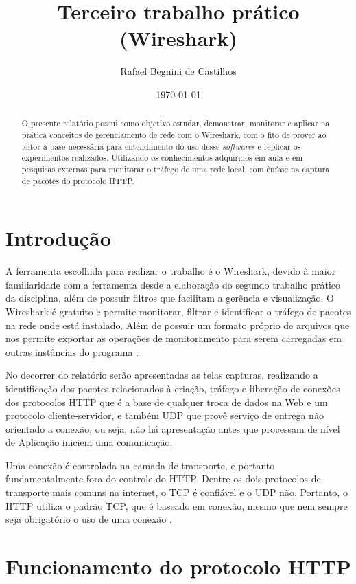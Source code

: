 \documentclass[12pt]{article}
\author{Rafael Begnini de Castilhos}
\title{Terceiro trabalho prático (Wireshark)}
\date{\today}
\begin{document}
\maketitle

\begin{abstract}
O presente relatório possui como objetivo estudar, demonstrar, monitorar e aplicar na prática conceitos de gerenciamento de rede com o Wireshark, com o fito de prover ao leitor a base necessária para entendimento  do uso desse \emph{softwares} e replicar os experimentos realizados. Utilizando os conhecimentos adquiridos em aula e em pesquisas externas para monitorar o tráfego de uma rede local, com ênfase na captura de pacotes do protocolo HTTP.
\end{abstract}

{\setlength\parskip {\fill}
    \tableofcontents
}


\section{Introdução}
A ferramenta escolhida para realizar o trabalho é o Wireshark, devido à maior familiaridade com a ferramenta desde a elaboração do segundo trabalho prático da disciplina, além de possuir filtros que facilitam a gerência e visualização. O Wireshark é gratuito e permite monitorar, filtrar e identificar o tráfego de pacotes na rede onde está instalado. Além de possuir um formato próprio de arquivos que nos permite exportar as operações de monitoramento para serem carregadas em outras instâncias do programa \cite{wireshark}.

No decorrer do relatório serão apresentadas as telas capturas, realizando a identificação dos pacotes relacionados à criação, tráfego e liberação de conexões dos  protocolos HTTP que é a base de qualquer troca de dados na Web e um protocolo cliente-servidor, e também UDP que provê serviço de entrega não orientado a conexão, ou seja, não há apresentação antes que processam de nível de Aplicação iniciem uma comunicação.

Uma conexão é controlada na camada de transporte, e portanto fundamentalmente fora do controle do HTTP. Dentre os dois protocolos de transporte mais comuns na internet, o TCP é confiável e o UDP não. Portanto, o HTTP utiliza o padrão TCP, que é baseado em conexão, mesmo que nem sempre seja obrigatório o uso de uma conexão \cite{mozilla}.

\section{Funcionamento do protocolo HTTP}
\end{document}
